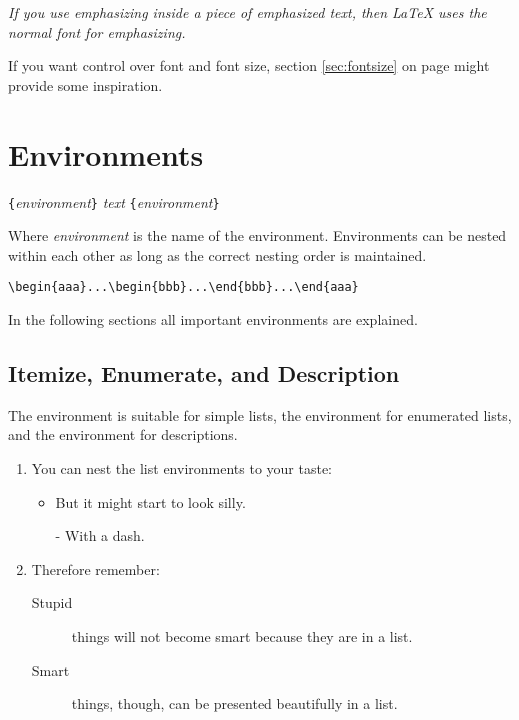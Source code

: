 \begin{example}
\emph{If you use 
  emphasizing inside a piece
  of emphasized text, then 
  \LaTeX{} uses the
  \emph{normal} font for 
  emphasizing.}
\end{example}

If you want control over font and font size, section \ref{sec:fontsize} on
page \pageref{sec:fontsize} might provide some inspiration.

\section{Environments} \label{env}

\begin{lscommand}
\verb|{|\emph{environment}\verb|}|\quad
   \emph{text}\quad
{}\verb|{|\emph{environment}\verb|}|
\end{lscommand}
\noindent Where \emph{environment} is the name of the environment. Environments can be
nested within each other as long as the correct nesting order is
maintained.
\begin{code}
\verb|\begin{aaa}...\begin{bbb}...\end{bbb}...\end{aaa}|
\end{code}

\noindent In the following sections all important environments are explained.

\subsection{Itemize, Enumerate, and Description}

The  environment is suitable for simple lists, the
 environment for enumerated lists, and the
 environment for descriptions.

\begin{example}
\flushleft
\begin{enumerate}
\item You can nest the list
environments to your taste:
\begin{itemize}
\item But it might start to
look silly. 
\item[-] With a dash.
\end{itemize}
\item Therefore remember:
\begin{description}
\item[Stupid] things will not
become smart because they are
in a list.
\item[Smart] things, though,
can be presented beautifully
in a list.
\end{description}
\end{enumerate}
\end{example}
 

